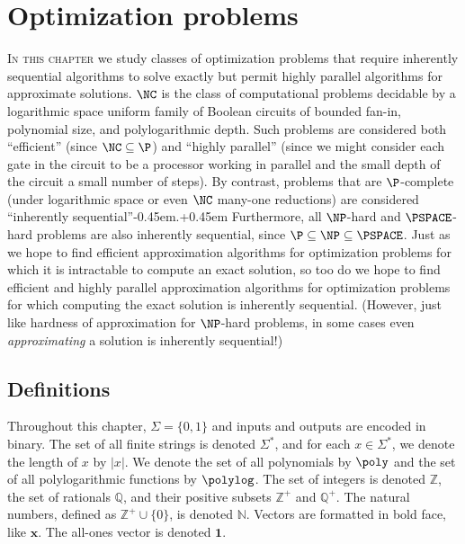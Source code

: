 \newcommand{\cl}{\operatorname{cl}}

\newlength{\myleftlen}
\newcommand{\setmyleftlen}[1]{\settowidth{\myleftlen}{\( \displaystyle
#1\)}}
\newcommand{\backup}{\hskip-\myleftlen\mkern-7mu}

\chapter{Optimization problems}
\label{chp:optimization}

\lettrine{I}{n this chapter} we study classes of optimization problems that require inherently sequential algorithms to solve exactly but permit highly parallel algorithms for approximate solutions.
$\NC$ is the class of computational problems decidable by a logarithmic space uniform family of Boolean circuits of bounded fan-in, polynomial size, and polylogarithmic depth.
Such problems are considered both ``efficient'' (since $\NC \subseteq \P$) and ``highly parallel'' (since we might consider each gate in the circuit to be a processor working in parallel and the small depth of the circuit a small number of steps).
By contrast, problems that are $\P$-complete (under logarithmic space or even $\NC$ many-one reductions) are considered ``inherently sequential''\kern-0.45em.\kern+0.45em
Furthermore, all $\NP$-hard and $\PSPACE$-hard problems are also inherently sequential, since $\P \subseteq \NP \subseteq \PSPACE$.
Just as we hope to find efficient approximation algorithms for optimization problems for which it is intractable to compute an exact solution, so too do we hope to find efficient and highly parallel approximation algorithms for optimization problems for which computing the exact solution is inherently sequential.
(However, just like hardness of approximation for $\NP$-hard problems, in some cases even \emph{approximating} a solution is inherently sequential!)

\section{Definitions}

Throughout this chapter, $\Sigma=\{0, 1\}$ and inputs and outputs are encoded in binary.
The set of all finite strings is denoted $\Sigma^*$, and for each $x \in \Sigma^*$, we denote the length of $x$ by $|x|$.
We denote the set of all polynomials by $\poly$ and the set of all polylogarithmic functions by $\polylog$.
The set of integers is denoted $\mathbb{Z}$, the set of rationals $\mathbb{Q}$, and their positive subsets $\mathbb{Z}^+$ and $\mathbb{Q}^+$.
The natural numbers, defined as $\mathbb{Z}^+ \cup \{0\}$, is denoted $\mathbb{N}$.
Vectors are formatted in bold face, like $\mathbf{x}$.
The all-ones vector is denoted $\mathbf{1}$.

